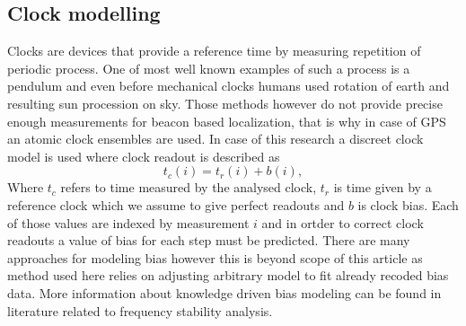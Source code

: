 \documentclass{kybernetika}
\begin{document}
\subsection{Clock modelling}
Clocks are devices that provide a reference time by measuring repetition of periodic 
process. One of most well known examples of such a process is a pendulum and even before
mechanical clocks humans used rotation of earth and resulting sun procession on sky.
Those methods however do not provide precise enough measurements for beacon based localization,
that is why in case of GPS an atomic clock ensembles are used.
In case of this research a discreet clock model is used where clock readout is described as 
\begin{equation}
	t_{c}(i) = t_{r}(i) + b(i),
\end{equation}
Where $t_{c}$ refers to time measured by the analysed clock, $t_{r}$ is time given by a 
reference clock which we assume to give perfect readouts and $b$ is clock bias.
Each of those values are indexed by measurement $i$ and in ortder to correct clock readouts
a value of bias for each step must be predicted.
There are many approaches for modeling bias however this is beyond scope of this article
as method used here relies on adjusting arbitrary model to fit already recoded bias data.
More information about knowledge driven bias modeling can be found in literature related to
frequency stability analysis\cite{Riley1994}.

\end{document}
